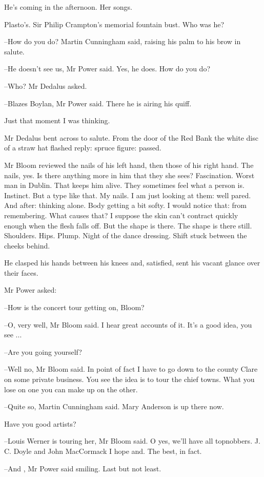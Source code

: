 He's coming in the afternoon.
Her songs.

Plasto's.
Sir Philip Crampton's memorial fountain bust.
Who was he?

--How do you do?
Martin Cunningham said,
raising his palm to his brow in salute.

--He doesn't see us, Mr Power said.
Yes, he does.
How do you do?

--Who?
Mr Dedalus asked.

--Blazes Boylan,
Mr Power said.
There he is airing his quiff.

Just that moment I was thinking.

Mr Dedalus bent across to salute.
From the door of the Red Bank the white disc of a straw hat flashed reply:
spruce figure:
passed.

Mr Bloom reviewed the nails of his left hand,
then those of his right hand.
The nails, yes.
Is there anything more in him that they she sees?
Fascination.
Worst man in Dublin.
That keeps him alive.
They sometimes feel what a person is.
Instinct.
But a type like that.
My nails.
I am just looking at them:
well pared.
And after:
thinking alone.
Body getting a bit softy.
I would notice that:
from remembering.
What causes that?
I suppose the skin can't contract quickly enough when the flesh falls off.
But the shape is there.
The shape is there still.
Shoulders.
Hips.
Plump.
Night of the dance dressing.
Shift stuck between the cheeks behind.

He clasped his hands between his knees
and, satisfied, sent his vacant glance over their faces.

Mr Power asked:

--How is the concert tour getting on, Bloom?

--O, very well,
Mr Bloom said.
I hear great accounts of it.
It's a good idea, you see ...

--Are you going yourself?

--Well no,
Mr Bloom said.
In point of fact
I have to go down to the county Clare on some private business.
You see the idea is to tour the chief towns.
What you lose on one
you can make up on the other.

--Quite so,
Martin Cunningham said.
Mary Anderson is up there now.

Have you good artists?

--Louis Werner is touring her,
Mr Bloom said.
O yes, we'll have all topnobbers.
J. C. Doyle and John MacCormack I hope and.
The best, in fact.

--And ,
Mr Power said smiling.
Last but not least.

